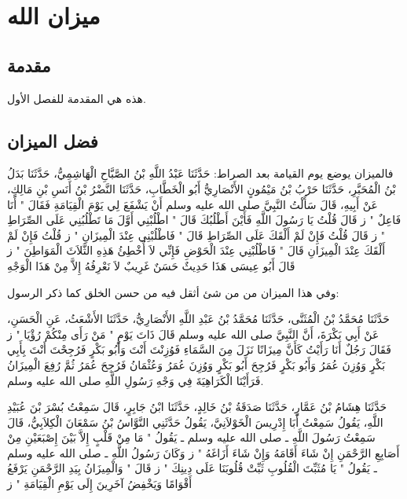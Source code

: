 
\chapter{ميزان الله}

\section{مقدمة}
هذه هي المقدمة للفصل الأول.


\section{فضل الميزان}


فالميزان يوضع يوم القيامة بعد الصراط:
حَدَّثَنَا عَبْدُ اللَّهِ بْنُ الصَّبَّاحِ الْهَاشِمِيُّ، حَدَّثَنَا بَدَلُ بْنُ الْمُحَبَّرِ، حَدَّثَنَا حَرْبُ بْنُ مَيْمُونٍ الأَنْصَارِيُّ أَبُو الْخَطَّابِ، حَدَّثَنَا النَّضْرُ بْنُ أَنَسِ بْنِ مَالِكٍ، عَنْ أَبِيهِ، قَالَ سَأَلْتُ النَّبِيَّ صلى الله عليه وسلم أَنْ يَشْفَعَ لِي يَوْمَ الْقِيَامَةِ فَقَالَ " أَنَا فَاعِلٌ " ز قَالَ قُلْتُ يَا رَسُولَ اللَّهِ فَأَيْنَ أَطْلُبُكَ قَالَ " اطْلُبْنِي أَوَّلَ مَا تَطْلُبُنِي عَلَى الصِّرَاطِ " ز قَالَ قُلْتُ فَإِنْ لَمْ أَلْقَكَ عَلَى الصِّرَاطِ قَالَ " فَاطْلُبْنِي عِنْدَ الْمِيزَانِ " ز قُلْتُ فَإِنْ لَمْ أَلْقَكَ عِنْدَ الْمِيزَانِ قَالَ " فَاطْلُبْنِي عِنْدَ الْحَوْضِ فَإِنِّي لاَ أُخْطِئُ هَذِهِ الثَّلاَثَ الْمَوَاطِنَ " ز قَالَ أَبُو عِيسَى هَذَا حَدِيثٌ حَسَنٌ غَرِيبٌ لاَ نَعْرِفُهُ إِلاَّ مِنْ هَذَا الْوَجْهِ

وفي هذا الميزان من من شئ أثقل فيه من حسن الخلق كما ذكر الرسول:





حَدَّثَنَا مُحَمَّدُ بْنُ الْمُثَنَّى، حَدَّثَنَا مُحَمَّدُ بْنُ عَبْدِ اللَّهِ الأَنْصَارِيُّ، حَدَّثَنَا الأَشْعَثُ، عَنِ الْحَسَنِ، عَنْ أَبِي بَكْرَةَ، أَنَّ النَّبِيَّ صلى الله عليه وسلم قَالَ ذَاتَ يَوْمٍ " مَنْ رَأَى مِنْكُمْ رُؤْيَا " ز فَقَالَ رَجُلٌ أَنَا رَأَيْتُ كَأَنَّ مِيزَانًا نَزَلَ مِنَ السَّمَاءِ فَوُزِنْتَ أَنْتَ وَأَبُو بَكْرٍ فَرُجِحْتَ أَنْتَ بِأَبِي بَكْرٍ وَوُزِنَ عُمَرُ وَأَبُو بَكْرٍ فَرُجِحَ أَبُو بَكْرٍ وَوُزِنَ عُمَرُ وَعُثْمَانُ فَرُجِحَ عُمَرُ ثُمَّ رُفِعَ الْمِيزَانُ فَرَأَيْنَا الْكَرَاهِيَةَ فِي وَجْهِ رَسُولِ اللَّهِ صلى الله عليه وسلم.


حَدَّثَنَا هِشَامُ بْنُ عَمَّارٍ، حَدَّثَنَا صَدَقَةُ بْنُ خَالِدٍ، حَدَّثَنَا ابْنُ جَابِرٍ، قَالَ سَمِعْتُ بُسْرَ بْنَ عُبَيْدِ اللَّهِ، يَقُولُ سَمِعْتُ أَبَا إِدْرِيسَ الْخَوْلاَنِيَّ، يَقُولُ حَدَّثَنِي النَّوَّاسُ بْنُ سَمْعَانَ الْكِلاَبِيُّ، قَالَ سَمِعْتُ رَسُولَ اللَّهِ ـ صلى الله عليه وسلم ـ يَقُولُ " مَا مِنْ قَلْبٍ إِلاَّ بَيْنَ إِصْبَعَيْنِ مِنْ أَصَابِعِ الرَّحْمَنِ إِنْ شَاءَ أَقَامَهُ وَإِنْ شَاءَ أَزَاغَهُ " ز وَكَانَ رَسُولُ اللَّهِ ـ صلى الله عليه وسلم ـ يَقُولُ " يَا مُثَبِّتَ الْقُلُوبِ ثَبِّتْ قُلُوبَنَا عَلَى دِينِكَ " ز قَالَ " وَالْمِيزَانُ بِيَدِ الرَّحْمَنِ يَرْفَعُ أَقْوَامًا وَيَخْفِضُ آخَرِينَ إِلَى يَوْمِ الْقِيَامَةِ " ز

